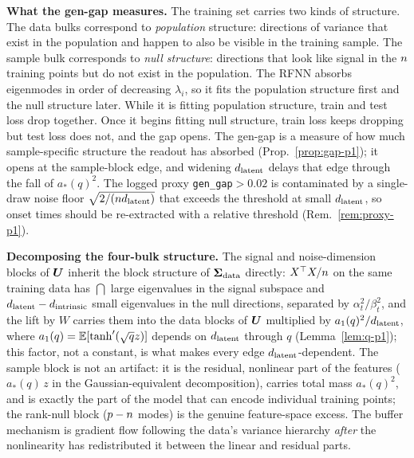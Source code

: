 \textbf{What the gen-gap measures.}
The training set carries two kinds of structure. The data bulks correspond to \emph{population} structure: directions of variance that exist in the population and happen to also be visible in the training sample. The sample bulk corresponds to \emph{null structure}: directions that look like signal in the $n$ training points but do not exist in the population. The RFNN absorbs eigenmodes in order of decreasing $\lambda_i$, so it fits the population structure first and the null structure later. While it is fitting population structure, train and test loss drop together. Once it begins fitting null structure, train loss keeps dropping but test loss does not, and the gap opens. The gen-gap is a measure of how much sample-specific structure the readout has absorbed (Prop.~\ref{prop:gap-p1}); it opens at the sample-block edge, and widening $d_{\mathrm{latent}}$ delays that edge through the fall of $a_*(q)^2$. The logged proxy \texttt{gen\_gap}$>0.02$ is contaminated by a single-draw noise floor $\sqrt{2/(nd_{\mathrm{latent}})}$ that exceeds the threshold at small $d_{\mathrm{latent}}$, so onset times should be re-extracted with a relative threshold (Rem.~\ref{rem:proxy-p1}).

\textbf{Decomposing the four-bulk structure.}
The signal and noise-dimension blocks of $\bm{U}$ inherit the block structure of $\bm{\Sigma}_{\mathrm{data}}$ directly: $X^\top X / n$ on the same training data has $\dint$ large eigenvalues in the signal subspace and $d_{\mathrm{latent}} - d_{\mathrm{intrinsic}}$ small eigenvalues in the null directions, separated by $\alpha_t^2/\beta_t^2$, and the lift by $W$ carries them into the data blocks of $\bm{U}$ multiplied by $a_1(q)^2/d_{\mathrm{latent}}$, where $a_1(q)=\mathbb{E}[\tanh'(\sqrt q z)]$ depends on $d_{\mathrm{latent}}$ through $q$ (Lemma~\ref{lem:q-p1}); this factor, not a constant, is what makes every edge $d_{\mathrm{latent}}$-dependent. The sample block is not an artifact: it is the residual, nonlinear part of the features ($a_*(q)\,z$ in the Gaussian-equivalent decomposition), carries total mass $a_*(q)^2$, and is exactly the part of the model that can encode individual training points; the rank-null block ($p-n$ modes) is the genuine feature-space excess. The buffer mechanism is gradient flow following the data's variance hierarchy \emph{after} the nonlinearity has redistributed it between the linear and residual parts.


